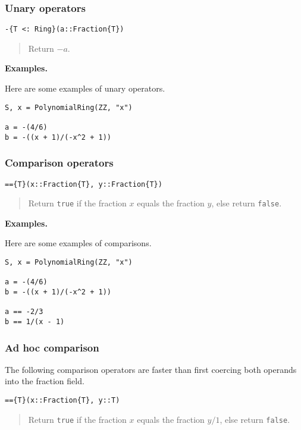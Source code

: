 \documentclass[a4paper,10pt]{article}
\newcommand{\code}{\lstinline}
\newcommand{\desc}[1]{\vspace{-3mm}\begin{quote}#1\end{quote}}
\begin{document}
{{{\subsubsection{Unary operators}

\begin{lstlisting}
-{T <: Ring}(a::Fraction{T})
\end{lstlisting}

\desc{Return $-a$.}

\textbf{Examples.}

Here are some examples of unary operators.

\begin{lstlisting}
S, x = PolynomialRing(ZZ, "x")

a = -(4/6)
b = -((x + 1)/(-x^2 + 1))
\end{lstlisting}

\subsubsection{Comparison operators}

\begin{lstlisting}
=={T}(x::Fraction{T}, y::Fraction{T})
\end{lstlisting}

\desc{Return \code{true} if the fraction $x$ equals the fraction $y$, else
return \code{false}.}

\textbf{Examples.}

Here are some examples of comparisons.

\begin{lstlisting}
S, x = PolynomialRing(ZZ, "x")

a = -(4/6)
b = -((x + 1)/(-x^2 + 1))

a == -2/3
b == 1/(x - 1)
\end{lstlisting}

\subsubsection{Ad hoc comparison}

The following comparison operators are faster than first coercing both
operands into the fraction field.

\begin{lstlisting}
=={T}(x::Fraction{T}, y::T)
\end{lstlisting}

\desc{Return \code{true} if the fraction $x$ equals the fraction $y/1$, else
return \code{false}.}

}}}
\end{document}
